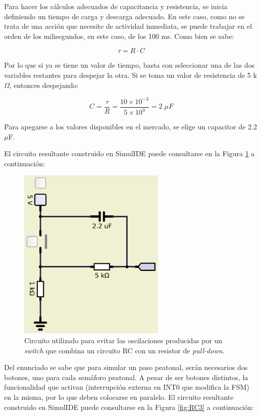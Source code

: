 Para hacer los cálculos adecuados de capacitancia y resistencia, se inicia definiendo un tiempo de carga y descarga adecuado. En este caso, como no se trata de una acción que necesite de actividad inmediata, se puede trabajar en el orden de los milisegundos, en este caso, de los 100 ms. Como bien se sabe: 

\begin{equation}
    \tau = R \cdot C
\end{equation}

Por lo que si ya se tiene un valor de tiempo, basta con seleccionar una de las dos variables restantes para despejar la otra. Si se toma un valor de resistencia de 5 k$\Omega$, entonces despejando:

\begin{equation}
    C = \frac{\tau}{R} = \frac{10 \times 10^{-3}}{5 \times 10^{3}} = 2 \; \mu F
\end{equation}

\noindent Para apegarse a los valores disponibles en el mercado, se elige un capacitor de 2.2 $\mu$F. 

El circuito resultante construido en SimulIDE puede consultarse en la Figura \ref{fig:RC2} a continuación: 

\begin{figure}[H]
\centering
\includegraphics[width=70mm]{./Figuras/Nota_teorica/RC2}
\caption{Circuito utilizado para evitar las oscilaciones producidas por un \textit{switch} que combina un circuito RC con un resistor de \textit{pull-down}.}
\label{fig:RC2}
\end{figure}

Del enunciado se sabe que para simular un paso peatonal, serán necesarios dos botones, uno para cada semáforo peatonal. A pesar de ser botones distintos, la funcionalidad que activan (interrupción externa en INT0 que modifica la FSM) en la misma, por lo que deben colocarse en paralelo. El circuito resultante construido en SimulIDE puede consultarse en la Figura \ref{fig:RC3} a continuación: 

